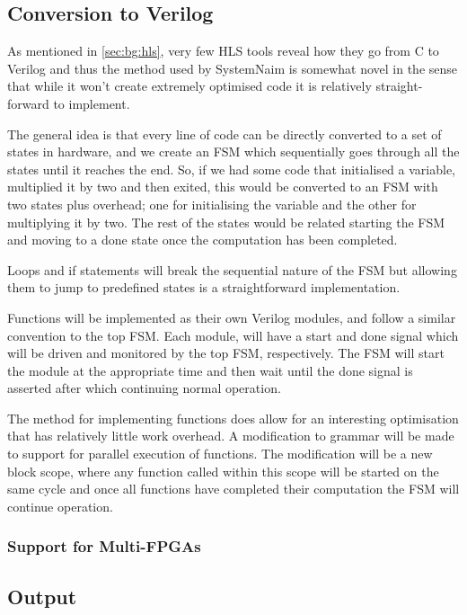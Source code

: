 \subsection{Conversion to Verilog}

As mentioned in \autoref{sec:bg:hls}, very few HLS tools reveal how they go from C to Verilog and thus the method used by SystemNaim is somewhat novel in the sense that while it won't create extremely optimised code it is relatively straight-forward to implement. 

The general idea is that every line of code can be directly converted to a set of states in hardware, and we create an FSM which sequentially goes through all the states until it reaches the end. So, if we had some code that initialised a variable, multiplied it by two and then exited, this would be converted to an FSM with two states plus overhead; one for initialising the variable and the other for multiplying it by two. The rest of the states would be related starting the FSM and moving to a done state once the computation has been completed.

Loops and if statements will break the sequential nature of the FSM but allowing them to jump to predefined states is a straightforward implementation.

Functions will be implemented as their own Verilog modules, and follow a similar convention to the top FSM. Each module, will have a start and done signal which will be driven and monitored by the top FSM, respectively. The FSM will start the module at the appropriate time and then wait until the done signal is asserted after which continuing normal operation.

The method for implementing functions does allow for an interesting optimisation that has relatively little work overhead. A modification to grammar will be made to support for parallel execution of functions. The modification will be a new block scope, where any function called within this scope will be started on the same cycle and once all functions have completed their computation the FSM will continue operation.

\subsubsection{Support for Multi-FPGAs}



\subsection{Output}

